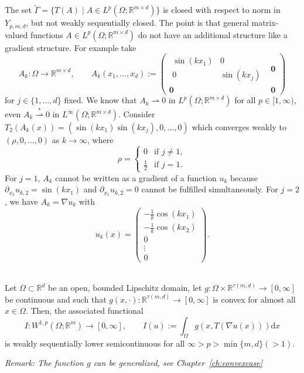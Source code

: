 The set $\widetilde{\Gamma}=\{T(A)\mid A\in L^p(\Omega;\mathbb{R}^{m\times d})\}$ is closed with respect to norm in $Y_{p,m,d}$, but not weakly sequentially closed. The point is that general matrix-valued functions $A\in L^p(\Omega;\mathbb{R}^{m\times d})$ do not have an additional structure like a gradient structure. For example take
\[A_k:\Omega\longrightarrow\mathbb{R}^{m\times d},\qquad A_k(x_1,\dotsc,x_d):=\left(\begin{array}{c|c}
	\begin{array}{cc}
		\sin(kx_1)&0\\
		0&\sin(kx_j)
	\end{array}&\textbf{0}\\ \hline
	\textbf{0}&\textbf{0}
\end{array}\right)\]
for $j\in\{1,\dotsc,d\}$ fixed. We know that $A_k\rightharpoonup0$ in $L^p(\Omega;\mathbb{R}^{m\times d})$ for all $p\in[1,\infty)$, even $A_k\overset{*}{\rightharpoonup}0$ in $L^\infty(\Omega;\mathbb{R}^{m\times d})$. Consider $T_2(A_k(x))=(\sin(kx_1)\sin(kx_j),0,\dotsc,0)$ which converges weakly to $(\rho,0,\dotsc,0)$ as $k\to\infty$, where
\[\rho=\left\{\begin{array}{rl}
	0&\text{if }j\ne1,\\
	\frac{1}{2}&\text{if }j=1.
\end{array}\right.\]
For $j=1$, $A_k$ cannot be written as a gradient of a function $u_k$ because $\partial_{x_2}u_{k,2}=\sin(kx_1)$ and $\partial_{x_1}u_{k,2}=0$ cannot be fulfilled simultaneously. For $j=2$, we have $A_k=\nabla u_k$ with
\[u_k(x)=\begin{pmatrix}
	-\frac{1}{k}\cos(kx_1)\\
	-\frac{1}{k}\cos(kx_2)\\
	0\\
	\vdots\\
	0
\end{pmatrix}.\]\\

\begin{theorem}
Let $\Omega\subset\mathbb{R}^d$ be an open, bounded Lipschitz domain, let $g:\Omega\times\mathbb{R}^{\tau(m,d)}\longrightarrow[0,\infty]$ be continuous and such that $g(x,\cdot):\mathbb{R}^{\tau(m,d)}\longrightarrow[0,\infty]$ is convex for almost all $x\in\Omega$. Then, the associated functional
\[I:W^{1,p}(\Omega;\mathbb{R}^m)\longrightarrow[0,\infty],\qquad I(u):=\int_\Omega{g(x,T(\nabla u(x)))\mathrm{d}x}\]
is weakly sequentially lower semicontinuous for all $\infty>p>\min\{m,d\}(>1)$.\\
\end{theorem}
\textit{Remark: The function $g$ can be generalized, see Chapter~\ref{ch:convexcase}}\\

